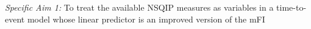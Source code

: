 \emph{Specific Aim 1:} To treat the available NSQIP measures as variables in a time-to-event model whose linear predictor is an improved version of the mFI